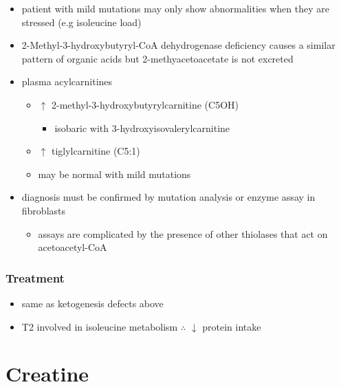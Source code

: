 \documentclass{scrartcl}
\begin{document}
\begin{enumerate}
\begin{itemize}
\item patient with mild mutations may only show abnormalities when they
are stressed (e.g isoleucine load)
\item 2-Methyl-3-hydroxybutyryl-CoA dehydrogenase deficiency causes a
similar pattern of organic acids but 2-methyacetoacetate is not excreted
\item plasma acylcarnitines
\begin{itemize}
\item \(\uparrow\) 2-methyl-3-hydroxybutyrylcarnitine (C5OH)
\begin{itemize}
\item isobaric with 3-hydroxyisovalerylcarnitine
\end{itemize}
\item \(\uparrow\) tiglylcarnitine (C5:1)
\item may be normal with mild mutations
\end{itemize}
\item diagnosis must be confirmed by mutation analysis or enzyme assay in fibroblasts
\begin{itemize}
\item assays are complicated by the presence of other thiolases that act
on acetoacetyl-CoA
\end{itemize}
\end{itemize}
\end{enumerate}

\subsubsection{Treatment}
\label{sec:org2051369}
\begin{itemize}
\item same as ketogenesis defects above
\item T2 involved in isoleucine metabolism \(\therefore\) \(\downarrow\) protein intake
\end{itemize}
\section{Creatine}
\label{sec:org8d3c7aa}
\end{document}
